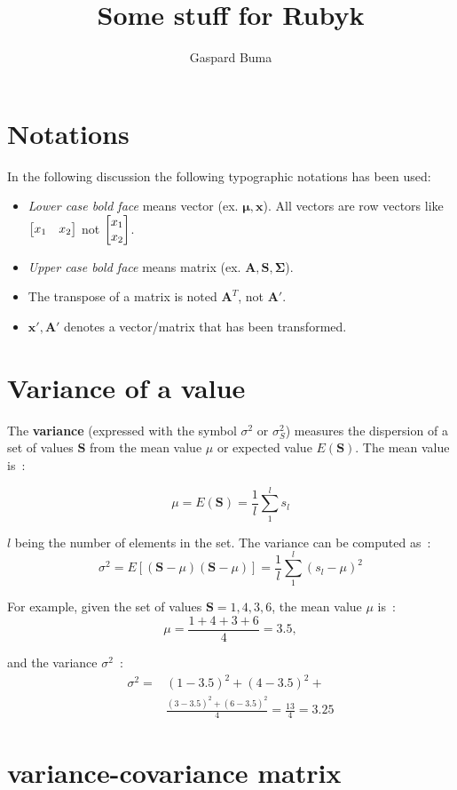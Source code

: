 \documentclass[11pt,twocolumn]{amsart} %
\title{Some stuff for Rubyk}
\author{Gaspard Buma}
\newcommand{\ve}[1]{\boldsymbol{#1}}
\newcommand{\ma}[1]{\boldsymbol{#1}}
\newenvironment{m}{\begin{bmatrix}}{\end{bmatrix}}
\begin{document}
\twocolumn[
\maketitle
]
\section{Notations}
In the following discussion the following typographic notations has been used:
\begin{itemize}
  \item \emph{Lower case bold face} means vector (ex. $\ve\mu, \ve{x}$). All vectors are row vectors like $\begin{m} x_1 & x_2 \end{m}$ not $\begin{m} x_1 \\ x_2 \end{m}$.
  \item \emph{Upper case bold face} means matrix (ex. $\ma{A}, \ma{S}, \ma{\Sigma}$).
  \item The transpose of a matrix is noted $\ma{A}^T$, not $\ma{A}'$.
  \item $\ve{x}', \ma{A}'$ denotes a vector/matrix that has been transformed.
\end{itemize}
\section{Variance of a value}

The \textbf{variance} (expressed with the symbol $\sigma^2$ or $\sigma_S^2$) measures the dispersion of a set of values $\ma{S}$ from the mean value $\mu$ or expected value $E(\ma{S})$. The mean value is~:

\[
  \mu = E(\ma{S}) = \frac{1}{l} \sum_1^{l} s_l
\]

$l$ being the number of elements in the set. The variance can be computed as~:
\[
  \sigma^2 = E[(\ma{S} - \mu)(\ma{S} - \mu)] = \frac{1}{l} \sum_1^{l} (s_l - \mu)^2
\]

For example, given the set of values $\ma{S} = {1,4,3,6}$, the mean value $\mu$ is~:
\[
  \mu = \frac{1+4+3+6}{4} = 3.5,
\]

and the variance $\sigma^2$~:
\begin{align*}
  \sigma^2 = & (1-3.5)^2 + (4-3.5)^2 +\\
             & \frac{(3-3.5)^2 + (6-3.5)^2}{4} = \frac{13}{4} = 3.25
\end{align*}

\section{variance-covariance matrix}
\end{document}
